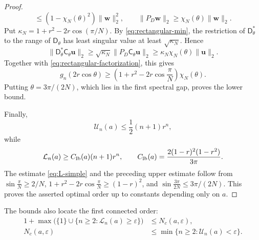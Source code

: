 \documentclass[preprints,article,accept,oneauthor]{Definitions/mdpi}
\numberwithin{equation}{section}
\theoremstyle{mdpi}
\theoremstyle{definition}
\begin{document}
\begin{proof}
\[ \leq(1-\chi_N(\theta)^2)\lVert\boldsymbol w\rVert_2^2,
 \qquad
 \lVert P_D\boldsymbol w\rVert_2\geq
 \chi_N(\theta)\lVert\boldsymbol w\rVert_2.
\]
Put \(\kappa_N=1+r^2-2r\cos(\pi/N)\).
By \eqref{eq:rectangular-min}, the restriction of
\(\mathsf D_\theta^*\) to the range of \(\mathsf D_\theta\) has least
singular value at least \(\sqrt{\kappa_N}\).  Hence
\[
 \lVert\mathsf D_\theta^*\mathsf C_\theta\boldsymbol u\rVert_2
 \geq\sqrt{\kappa_N}\lVert P_D\mathsf C_\theta\boldsymbol u\rVert_2
 \geq\kappa_N\chi_N(\theta)\lVert\boldsymbol u\rVert_2.
\]
Together with \eqref{eq:rectangular-factorization}, this gives
\[
 g_n(2r\cos\theta)\geq
 \left(1+r^2-2r\cos\frac{\pi}{N}\right)\chi_N(\theta).
\]
Putting \(\theta=3\pi/(2N)\), which lies in the first spectral gap,
proves the lower bound.

Finally,
\[
 \mathcal U_n(a)\leq\frac12(n+1)r^n,
\]
while
\begin{equation}\label{eq:L-simple}
 \mathcal L_n(a)\geq C_{\rm lb}(a)(n+1)r^n,\qquad
 C_{\rm lb}(a)=\frac{2(1-r)^2(1-r^2)}{3\pi}.
\end{equation}
The estimate \eqref{eq:L-simple} and the preceding upper estimate follow from
\(\sin\frac{\pi}{N}\geq2/N\),
\(1+r^2-2r\cos\frac{\pi}{N}\geq(1-r)^2\), and
\(\sin\frac{3\pi}{2N}\leq3\pi/(2N)\).  This proves the asserted optimal
order up to constants depending only on \(a\).
\end{proof}

The bounds also locate the first connected order:
\begin{equation}\label{eq:N-two-sided-main}
 \begin{aligned}
  1+\max\bigl(\{1\}\cup
  \{n\geq2:\mathcal L_n(a)\geq\varepsilon\}\bigr)
  &\leq N_c(a,\varepsilon),\\
  N_c(a,\varepsilon)
  &\leq\min\{n\geq2:\mathcal U_n(a)<\varepsilon\}.
 \end{aligned}
\end{equation}
\end{document}
